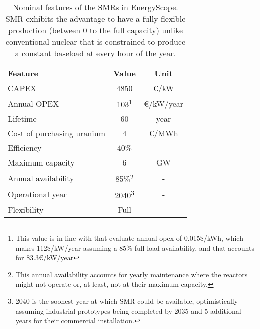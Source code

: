 \begin{table}[htbp!]
\caption{Nominal features of the SMRs in EnergyScope. \gls{SMR} exhibits the advantage to have a fully flexible production (\ie between 0 to the full capacity) unlike conventional nuclear that is constrained to produce a constant baseload at every hour of the year.}
\label{tab:SMR_features}
\begin{minipage}{\linewidth}
\centering
\begin{tabular}{l c c}
\toprule
\textbf{Feature} & \textbf{Value} & \textbf{Unit}\\
\midrule
CAPEX & 4850 & €/kW \\
Annual OPEX & 103\footnote{\label{foot:c_maint_SMR}This value is in line with \citet{smr_canada} that evaluate annual opex of 0.015\$/kWh, which makes 112\$/kW/year assuming a 85\% full-load availability, and \citet{PATHS2050} that accounts for 83.3€/kW/year} & €/kW/year \\
Lifetime & 60 & year \\
Cost of purchasing uranium & 4 & €/MWh\\
Efficiency & 40\% & -\\
Maximum capacity & 6 & GW \\
Annual availability & 85\%\footnote{\label{foot:avail_SMR}This annual availability accounts for yearly maintenance where the reactors might not operate or, at least, not at their maximum capacity. } & -\\
Operational year & 2040\footnote{\label{foot:op_year_SMR}2040 is the soonest year at which \gls{SMR} could be available, optimistically assuming industrial prototypes being completed by 2035 and 5 additional years for their commercial installation.} & - \\
Flexibility & Full & - \\
\bottomrule							

\end{tabular}
\end{minipage}
\end{table}


